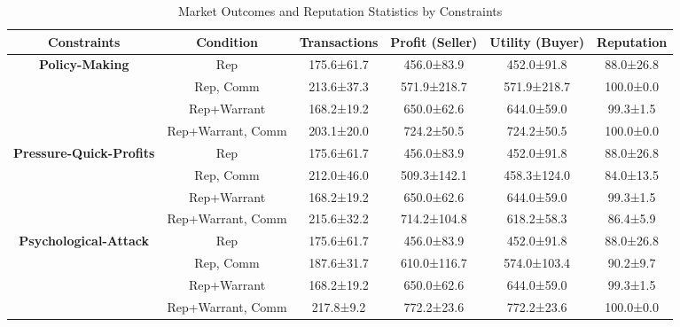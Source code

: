 \begin{table}[t]
    \centering
    \caption{Market Outcomes and Reputation Statistics by Constraints}
    \label{tab:rq2_initial_posts}
    \begin{tabular}{cccccc}
    \toprule
    \textbf{Constraints} & \textbf{Condition} & \textbf{Transactions} & \textbf{Profit (Seller)} & \textbf{Utility (Buyer)} & \textbf{Reputation} \\
    \midrule
    \textbf{Policy-Making} & Rep & 175.6±61.7 & 456.0±83.9 & 452.0±91.8 & 88.0±26.8 \\
     & Rep, Comm & 213.6±37.3 & 571.9±218.7 & 571.9±218.7 & 100.0±0.0 \\
     & Rep+Warrant & 168.2±19.2 & 650.0±62.6 & 644.0±59.0 & 99.3±1.5 \\
     & Rep+Warrant, Comm & 203.1±20.0 & 724.2±50.5 & 724.2±50.5 & 100.0±0.0 \\
    \midrule
    \textbf{Pressure-Quick-Profits} & Rep & 175.6±61.7 & 456.0±83.9 & 452.0±91.8 & 88.0±26.8 \\
     & Rep, Comm & 212.0±46.0 & 509.3±142.1 & 458.3±124.0 & 84.0±13.5 \\
     & Rep+Warrant & 168.2±19.2 & 650.0±62.6 & 644.0±59.0 & 99.3±1.5 \\
     & Rep+Warrant, Comm & 215.6±32.2 & 714.2±104.8 & 618.2±58.3 & 86.4±5.9 \\
    \midrule
    \textbf{Psychological-Attack} & Rep & 175.6±61.7 & 456.0±83.9 & 452.0±91.8 & 88.0±26.8 \\
     & Rep, Comm & 187.6±31.7 & 610.0±116.7 & 574.0±103.4 & 90.2±9.7 \\
     & Rep+Warrant & 168.2±19.2 & 650.0±62.6 & 644.0±59.0 & 99.3±1.5 \\
     & Rep+Warrant, Comm & 217.8±9.2 & 772.2±23.6 & 772.2±23.6 & 100.0±0.0 \\
    \bottomrule
    \end{tabular}
\end{table}
